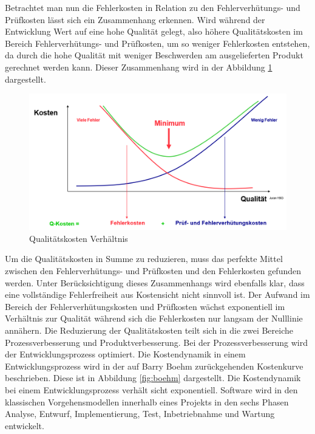 Betrachtet man nun die Fehlerkosten in Relation zu den Fehlerverhütungs- und Prüfkosten lässt sich ein Zusammenhang erkennen.
Wird während der Entwicklung Wert auf eine hohe Qualität gelegt, also höhere Qualitätskosten im Bereich Fehlerverhütungs- und Prüfkosten, um so weniger Fehlerkosten entstehen, da durch die hohe Qualität mit weniger Beschwerden am ausgelieferten Produkt gerechnet werden kann.
Dieser Zusammenhang wird in der Abbildung \ref{fig:QKostenVerhaeltnis} dargestellt.
\begin{figure}[H]
    \centering
    \includegraphics[width=1\textwidth]{images/qkostenverhaeltnis.png}
    \caption{Qualitätskosten Verhältnis}
    \label{fig:QKostenVerhaeltnis}
\end{figure}\noindent
Um die Qualitätskosten in Summe zu reduzieren, muss das perfekte Mittel zwischen den Fehlerverhütungs- und Prüfkosten und den Fehlerkosten gefunden werden.
Unter Berücksichtigung dieses Zusammenhangs wird ebenfalls klar, dass eine vollständige Fehlerfreiheit aus Kostensicht nicht sinnvoll ist.
Der Aufwand im Bereich der Fehlerverhütungskosten und Prüfkosten wächst exponentiell im Verhältnis zur Qualität während sich die Fehlerkosten nur langsam der Nulllinie annähern.
\newparagraph
Die Reduzierung der Qualitätskosten teilt sich in die zwei Bereiche Prozessverbesserung und Produktverbesserung.
Bei der Prozessverbesserung wird der Entwicklungsprozess optimiert.
Die Kostendynamik in einem Entwicklungsprozess wird in der auf Barry Boehm zurückgehenden Kostenkurve beschrieben.
Diese ist in Abbildung \ref{fig:boehm} dargestellt.
Die Kostendynamik bei einem Entwicklungsprozess verhält sicht exponentiell.
Software wird in den klassischen Vorgehensmodellen innerhalb eines Projekts in den sechs Phasen Analyse, Entwurf, Implementierung, Test, Inbetriebnahme und Wartung entwickelt.
